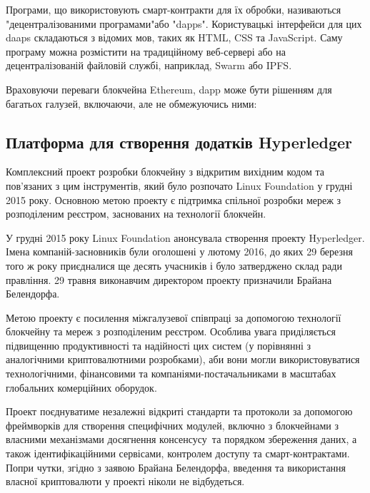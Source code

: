 \documentclass{lib/styles/default-style}
\begin{document}
    Програми, що використовують смарт-контракти для їх обробки, називаються "децентралізованими програмами"\enspace або "dapps".
    Користувацькі інтерфейси для цих daaps складаються з відомих мов, таких як HTML, CSS та JavaScript.
    Саму програму можна розмістити на традиційному веб-сервері або на децентралізованій файловій службі, наприклад, Swarm або IPFS.

    Враховуючи переваги блокчейна Ethereum, dapp може бути рішенням для багатьох галузей, включаючи, але не обмежуючись ними:


\subsection{Платформа для створення додатків Hyperledger}

    Комплексний проект розробки блокчейну з відкритим вихідним кодом та пов'язаних з цим інструментів,
    який було розпочато Linux Foundation у грудні 2015 року. Основною метою проекту є підтримка спільної
    розробки мереж з розподіленим реєстром, заснованих на технології блокчейн.
    
    У грудні 2015 року Linux Foundation анонсувала створення проекту Hyperledger.
    Імена компаній-засновників були оголошені у лютому 2016, до яких 29 березня того ж року приєдналися ще
    десять учасників і було затверджено склад ради правління. 29 травня виконавчим директором проекту призначили Брайана Белендорфа.
    
    Метою проекту є посилення міжгалузевої співпраці за допомогою технології блокчейну та мереж з розподіленим реєстром.
    Особлива увага приділяється підвищенню продуктивності та надійності цих систем (у порівнянні з аналогічними криптовалютними розробками),
    аби вони могли використовуватися технологічними, фінансовими та компаніями-постачальниками в масштабах глобальних комерційних оборудок. 
    
    Проект поєднуватиме незалежні відкриті стандарти та протоколи за допомогою фреймворків для створення специфічних модулей, включно з 
    блокчейнами з власними механізмами досягнення консенсусу та порядком збереження даних, а також ідентифікаційними сервісами, контролем
    доступу та смарт-контрактами. 	Попри чутки, згідно з заявою Брайана Белендорфа, введення та використання власної криптовалюти у проекті
    ніколи не відбудеться.
    
\end{document}
